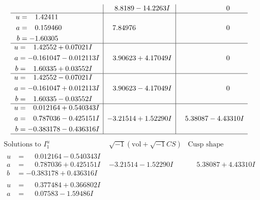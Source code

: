 \documentclass[1p]{elsarticle_modified}
\theoremstyle{definition}
\newcommand{\I}{\sqrt{-1}}
\begin{document}
$$\begin{array}{c|c|c}
 & \phantom{-}8.8189 - 14.2263 I & \phantom{-0.000000 } 0 \\ \hline\begin{aligned}
u &= \phantom{-}1.42411\phantom{ +0.000000I} \\
a &= \phantom{-}0.159460\phantom{ +0.000000I} \\
b &= -1.60305\phantom{ +0.000000I}\end{aligned}
 & \phantom{-}7.84976\phantom{ +0.000000I} & \phantom{-0.000000 } 0 \\ \hline\begin{aligned}
u &= \phantom{-}1.42552 + 0.07021 I \\
a &= -0.161047 - 0.012113 I \\
b &= \phantom{-}1.60335 + 0.03552 I\end{aligned}
 & \phantom{-}3.90623 + 4.17049 I & \phantom{-0.000000 } 0 \\ \hline\begin{aligned}
u &= \phantom{-}1.42552 - 0.07021 I \\
a &= -0.161047 + 0.012113 I \\
b &= \phantom{-}1.60335 - 0.03552 I\end{aligned}
 & \phantom{-}3.90623 - 4.17049 I & \phantom{-0.000000 } 0 \\ \hline\begin{aligned}
u &= \phantom{-}0.012164 + 0.540343 I \\
a &= \phantom{-}0.787036 - 0.425151 I \\
b &= -0.383178 - 0.436316 I\end{aligned}
 & -3.21514 + 1.52290 I & \phantom{-}5.38087 - 4.43310 I\\
 \hline 
 \end{array}$$\newpage$$\begin{array}{c|c|c}  
\text{Solutions to }I^u_{1}& \I (\text{vol} + \sqrt{-1}CS) & \text{Cusp shape}\\
 \hline 
\begin{aligned}
u &= \phantom{-}0.012164 - 0.540343 I \\
a &= \phantom{-}0.787036 + 0.425151 I \\
b &= -0.383178 + 0.436316 I\end{aligned}
 & -3.21514 - 1.52290 I & \phantom{-}5.38087 + 4.43310 I \\ \hline\begin{aligned}
u &= \phantom{-}0.377484 + 0.366802 I \\
a &= \phantom{-}0.07583 - 1.59486 I \\

\end{aligned}
\end{array}$$
\end{document}
